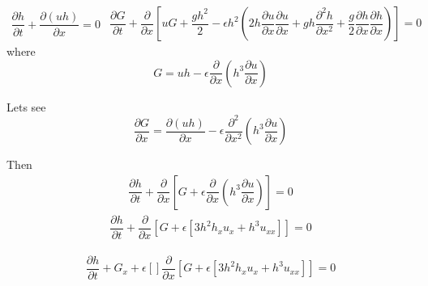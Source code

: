 \documentclass[subeqn]{article}
\begin{document}
\begin{subequations}
	\begin{gather}
	\dfrac{\partial h}{\partial t} + \dfrac{\partial (uh)}{\partial x} = 0
	\label{eq:gSV_Ga}
	\end{gather}
	\begin{gather}
	\dfrac{\partial G}{\partial t} + \dfrac{\partial }{\partial x} \left[ uG + \dfrac{gh^2}{2} - \epsilon h^2\left ( 2 h \dfrac{\partial u}{\partial x} \dfrac{\partial u}{\partial x} + gh \dfrac{\partial^2h}{\partial x^2} +\dfrac{g}{2} \dfrac{\partial h}{\partial x}\dfrac{\partial h}{\partial x} \right ) \right]= 0
	\label{eq:gSV_Gb}
	\end{gather}
	\label{eq:gSV_G}
\end{subequations}
where
\begin{equation}
G = uh - \epsilon \dfrac{\partial }{\partial x} \left (h^3 \dfrac{\partial u}{\partial x} \right )
\end{equation}

Lets see
\begin{equation}
\frac{ \partial G}{\partial x} = \frac{ \partial (uh)}{\partial x} - \epsilon \dfrac{\partial^2 }{\partial x^2} \left (h^3 \dfrac{\partial u}{\partial x} \right )
\end{equation}

Then
\begin{gather}
\dfrac{\partial h}{\partial t} + \dfrac{\partial}{\partial x} \left[G + \epsilon \dfrac{\partial }{\partial x} \left (h^3 \dfrac{\partial u}{\partial x} \right )\right] = 0
\end{gather}
\begin{gather}
\dfrac{\partial h}{\partial t} + \dfrac{\partial}{\partial x} \left[G + \epsilon\left[3h^2h_xu_x + h^3u_{xx}\right] \right] = 0
\end{gather}

\begin{gather}
\dfrac{\partial h}{\partial t} + G_x + \epsilon\left[\right] \dfrac{\partial}{\partial x} \left[G + \epsilon\left[3h^2h_xu_x + h^3u_{xx}\right] \right] = 0
\end{gather}
\end{document}
